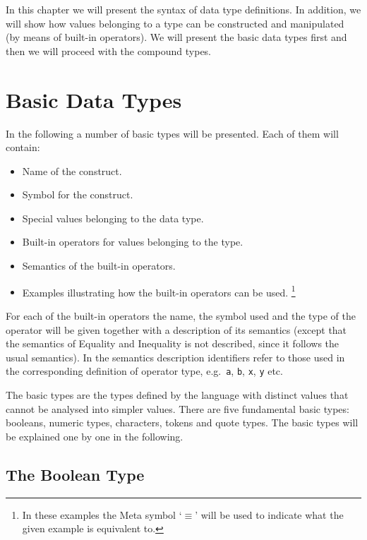 \documentclass{overturerepchap}
\begin{document}
In this chapter we will present the syntax of data type
definitions. In addition, we will show how values belonging to a type
can be constructed and manipulated (by means of built-in operators).
We will present the basic data types first and then we will proceed
with the compound types.

\section{Basic Data Types}

In the following a number of basic types will be presented. Each of
them will contain:

\begin{itemize}
\item Name of the construct.
\item Symbol for the construct.
\item Special values belonging to the data type.
\item Built-in operators for values belonging to the type.
\item Semantics of the built-in operators.
\item Examples illustrating how the built-in operators can be used.%
  \footnote{In these examples the Meta symbol `$\equiv$' will be used
    to indicate what the given example is equivalent to.}
\end{itemize}
For each of the built-in operators the name, the symbol used and the
type of the operator will be given together with a description of its
semantics (except that the semantics of Equality and Inequality is not
described, since it follows the usual semantics). In the semantics
description identifiers refer to those used in the corresponding
definition of operator type, e.g.\ {\tt a}, {\tt b}, {\tt x}, {\tt y}
etc.

The basic types are the types defined by the language with distinct
values that cannot be analysed into simpler values. There are five
fundamental basic types: booleans, numeric types,
characters, tokens and quote types. The basic types will be explained one by
one in the following.

\subsection{The Boolean Type}\label{bool}
\end{document}
